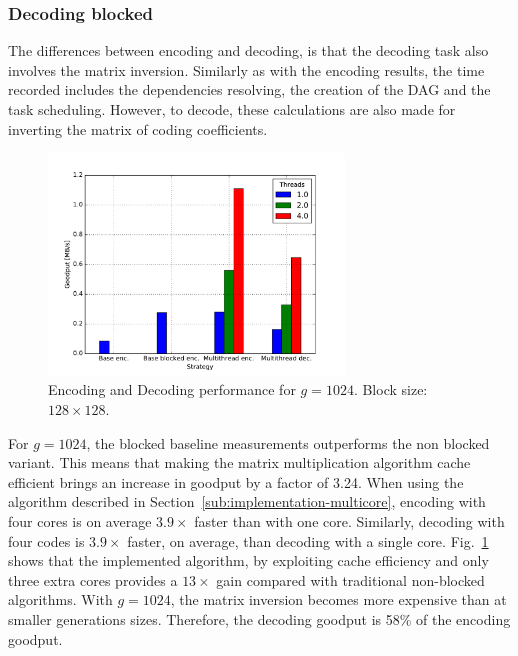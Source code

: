 \subsubsection{Decoding blocked}
The differences between encoding and decoding, is that the decoding task
also involves the matrix inversion. Similarly as with the encoding results,
the time recorded includes the dependencies resolving, the creation of the
\ac{DAG} and the task scheduling. However, to decode, these calculations
are also made for inverting the matrix of coding coefficients.

\begin{figure}[ht!]
\centering
\includegraphics[width=0.7\textwidth]{images/GenSize_1024_SymbolSize_1536.pdf}
\caption{Encoding and Decoding performance for $g = 1024$. Block size: $128 \times 128$.}
\label{enc_dec1024}
\end{figure}

For $g= 1024$, the blocked baseline measurements outperforms the non blocked
variant. This means that making the matrix multiplication algorithm cache
efficient brings an increase in goodput by a factor of 3.24. When using the
algorithm described in Section~\ref{sub:implementation-multicore}, encoding with
four cores is on average $3.9\times$ faster than with one core. Similarly,
decoding with four codes is $3.9\times$ faster, on average, than decoding with
a single core. Fig.~\ref{enc_dec1024} shows that the implemented algorithm, by
exploiting cache efficiency and only three extra cores provides a $13\times$
gain compared with traditional non-blocked algorithms. With $g = 1024$, the
matrix inversion becomes more expensive than at smaller generations sizes.
Therefore, the decoding goodput is 58\% of the encoding goodput.

